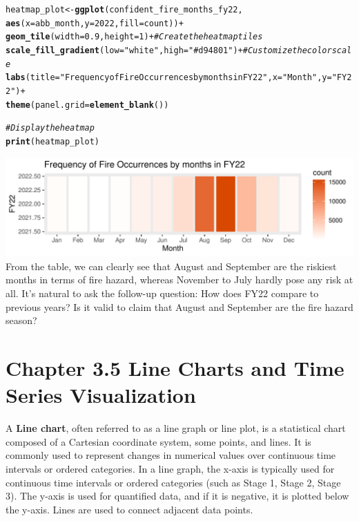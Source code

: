 \documentclass{article}\usepackage[]{graphicx}\usepackage[]{xcolor}
\makeatletter
\def\maxwidth{ %
  \ifdim\Gin@nat@width>\linewidth
    \linewidth
  \else
    \Gin@nat@width
  \fi
}
\newcommand{\hlnum}[1]{\textcolor[rgb]{0.686,0.059,0.569}{#1}}%
\newcommand{\hlstr}[1]{\textcolor[rgb]{0.192,0.494,0.8}{#1}}%
\newcommand{\hlcom}[1]{\textcolor[rgb]{0.678,0.584,0.686}{\textit{#1}}}%
\newcommand{\hlopt}[1]{\textcolor[rgb]{0,0,0}{#1}}%
\newcommand{\hlstd}[1]{\textcolor[rgb]{0.345,0.345,0.345}{#1}}%
\newcommand{\hlkwb}[1]{\textcolor[rgb]{0.69,0.353,0.396}{#1}}%
\newcommand{\hlkwc}[1]{\textcolor[rgb]{0.333,0.667,0.333}{#1}}%
\newcommand{\hlkwd}[1]{\textcolor[rgb]{0.737,0.353,0.396}{\textbf{#1}}}%
\newenvironment{kframe}{%
 \def\at@end@of@kframe{}%
 \ifinner\ifhmode%
  \def\at@end@of@kframe{\end{minipage}}%
  \begin{minipage}{\columnwidth}%
 \fi\fi%
 \def\FrameCommand##1{\hskip\@totalleftmargin \hskip-\fboxsep
 \colorbox{shadecolor}{##1}\hskip-\fboxsep
     \hskip-\linewidth \hskip-\@totalleftmargin \hskip\columnwidth}%
 \MakeFramed {\advance\hsize-\width
   \@totalleftmargin\z@ \linewidth\hsize
   \@setminipage}}%
 {\par\unskip\endMakeFramed%
 \at@end@of@kframe}
\newenvironment{knitrout}{}{} %
\makeatother
\begin{document}
\begin{knitrout}
\color{fgcolor}\begin{kframe}
\begin{alltt}
\hlstd{heatmap_plot} \hlkwb{<-} \hlkwd{ggplot}\hlstd{(confident_fire_months_fy22,}
                       \hlkwd{aes}\hlstd{(}\hlkwc{x} \hlstd{= abb_month,} \hlkwc{y} \hlstd{=} \hlnum{2022}\hlstd{,} \hlkwc{fill} \hlstd{= count))} \hlopt{+}
  \hlkwd{geom_tile}\hlstd{(}\hlkwc{width} \hlstd{=} \hlnum{0.9}\hlstd{,} \hlkwc{height} \hlstd{=} \hlnum{1}\hlstd{)} \hlopt{+}  \hlcom{# Create the heatmap tiles}
  \hlkwd{scale_fill_gradient}\hlstd{(}\hlkwc{low} \hlstd{=} \hlstr{"white"}\hlstd{,} \hlkwc{high} \hlstd{=} \hlstr{"#d94801"}\hlstd{)} \hlopt{+}  \hlcom{# Customize the color scale}
  \hlkwd{labs}\hlstd{(}\hlkwc{title} \hlstd{=} \hlstr{"Frequency of Fire Occurrences by months in FY22"}\hlstd{,} \hlkwc{x} \hlstd{=} \hlstr{"Month"}\hlstd{,} \hlkwc{y} \hlstd{=} \hlstr{"FY22"}\hlstd{)} \hlopt{+}
  \hlkwd{theme}\hlstd{(}\hlkwc{panel.grid} \hlstd{=} \hlkwd{element_blank}\hlstd{() )}

\hlcom{# Display the heatmap}
\hlkwd{print}\hlstd{(heatmap_plot)}
\end{alltt}
\end{kframe}
\includegraphics[width=\maxwidth]{figure/fire-by-months_fy22-1} 
\end{knitrout}
From the table, we can clearly see that August and September are the riskiest months in terms of fire hazard, whereas November to July hardly pose any risk at all. It's natural to ask the follow-up question: How does FY22 compare to previous years? Is it valid to claim that August and September are the fire hazard season?


\section*{Chapter 3.5 Line Charts and Time Series Visualization}

A \textbf{Line chart}, often referred to as a line graph or line plot, is a statistical chart composed of a Cartesian coordinate system, some points, and lines. It is commonly used to represent changes in numerical values over continuous time intervals or ordered categories. In a line graph, the x-axis is typically used for continuous time intervals or ordered categories (such as Stage 1, Stage 2, Stage 3). The y-axis is used for quantified data, and if it is negative, it is plotted below the y-axis. Lines are used to connect adjacent data points.
\end{document}
